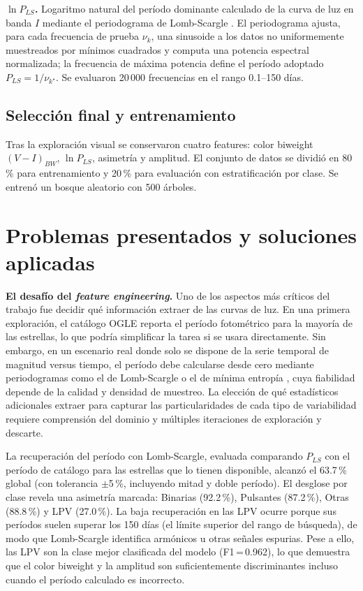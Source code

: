 \documentclass[letterpaper,12pt]{extarticle}
\begin{document}
\textbf{$\ln P_{LS}$.} Logaritmo natural del período dominante calculado de la
curva de luz en banda $I$ mediante el periodograma de Lomb-Scargle
\citep{lomb_1976, scargle_1982}. El periodograma ajusta, para cada frecuencia de
prueba $\nu_k$, una sinusoide a los datos no uniformemente muestreados por mínimos
cuadrados y computa una potencia espectral normalizada; la frecuencia de máxima
potencia define el período adoptado $P_{LS} = 1/\nu_{k^\star}$. Se evaluaron
20\,000 frecuencias en el rango 0.1--150 días.

\subsection{Selección final y entrenamiento}

Tras la exploración visual se conservaron cuatro features: color biweight
$(V-I)_{BW}$, $\ln P_{LS}$, asimetría y amplitud. El conjunto de datos se dividió
en 80\,\% para entrenamiento y 20\,\% para evaluación con estratificación por
clase. Se entrenó un bosque aleatorio con 500 árboles.

\section{Problemas presentados y soluciones aplicadas}
\label{sec:problemas}

\textbf{El desafío del \textit{feature engineering}.}
Uno de los aspectos más críticos del trabajo fue decidir qué información extraer
de las curvas de luz. En una primera exploración, el catálogo OGLE reporta el
período fotométrico para la mayoría de las estrellas, lo que podría simplificar
la tarea si se usara directamente. Sin embargo, en un escenario real donde solo
se dispone de la serie temporal de magnitud versus tiempo, el período debe
calcularse desde cero mediante periodogramas como el de Lomb-Scargle
\citep{lomb_1976, scargle_1982} o el de mínima entropía \citep{cincotta_1995},
cuya fiabilidad depende de la calidad y densidad de muestreo. La elección de qué
estadísticos adicionales extraer para capturar las particularidades de cada tipo
de variabilidad requiere comprensión del dominio y múltiples iteraciones de
exploración y descarte.

La recuperación del período con Lomb-Scargle, evaluada comparando $P_{LS}$ con
el período de catálogo para las estrellas que lo tienen disponible, alcanzó el
63.7\,\% global (con tolerancia $\pm$5\,\%, incluyendo mitad y doble período).
El desglose por clase revela una asimetría marcada: Binarias (92.2\,\%), Pulsantes
(87.2\,\%), Otras (88.8\,\%) y LPV (27.0\,\%). La baja recuperación en las LPV
ocurre porque sus períodos suelen superar los 150 días (el límite superior del
rango de búsqueda), de modo que Lomb-Scargle identifica armónicos u otras señales
espurias. Pese a ello, las LPV son la clase mejor clasificada del modelo (F1\,=\,0.962),
lo que demuestra que el color biweight y la amplitud son suficientemente
discriminantes incluso cuando el período calculado es incorrecto.
\end{document}
